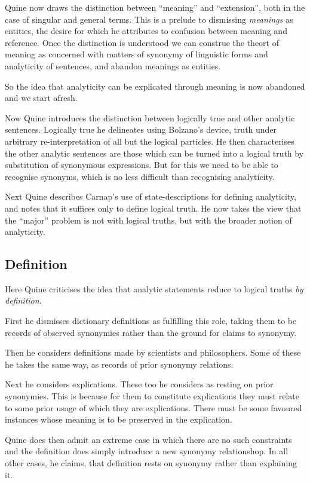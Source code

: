 Quine now draws the distinction between ``meaning'' and ``extension'', both in the case of singular and general terms.
This is a prelude to dismissing \emph{meanings} as entities, the desire for which he attributes to confusion between meaning and reference.
Once the distinction is understood we can construe the theort of meaning as concerned with matters of synonymy of linguistic forms and analyticity of sentences, and abandon meanings as entities. 

So the idea that analyticity can be explicated through meaning is now abandoned and we start afresh.

Now Quine introduces the distinction between logically true and other analytic sentences.
Logically true he delineates using Bolzano's device, truth under arbitrary re-interpretation of all but the logical particles.
He then characterises the other analytic sentences are those which can be turned into a logical truth by substitution of synonymous expressions.
But for this we need to be able to recognise synonyms, which is no less difficult than recognising analyticity.

Next Quine describes Carnap's use of state-descriptions for defining analyticity, and notes that it suffices only to define logical truth.
He now takes the view that the ``major'' problem is not with logical truths, but with the broader notion of analyticity.

\subsection{Definition}

Here Quine criticises the idea that analytic statements reduce to logical truths \emph{by definition}.

First he dismisses dictionary definitions as fulfilling this role, taking them to be records of observed synonymies rather than the ground for claims to synonymy.

Then he considers definitions made by scientists and philosophers.
Some of these he takes the same way, as records of prior synonymy relations.

Next he considers explications.
These too he considers as resting on prior synonymies.
This is because for them to constitute explications they must relate to some prior usage of which they are explications.
There must be some favoured instances whose meaning is to be preserved in the explication.

Quine does then admit an extreme case in which there are no such constraints and the definition does simply introduce a new synonymy relationshop.
In all other cases, he claims, that definition rests on synonymy rather than explaining it.

